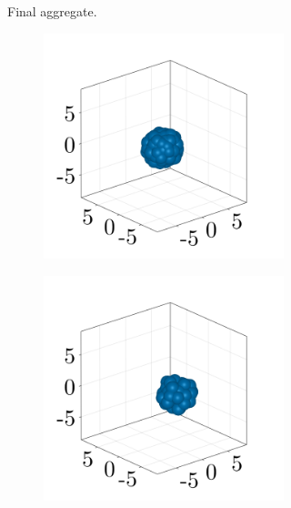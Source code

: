 \begin{figure}[ht]
\begin{subfigure}{\textwidth}
\begin{subfigure}{0.22\textwidth}
        \end{subfigure}
        \caption{Final aggregate.}
    \end{subfigure}
    \vspace{0.5em}
    \begin{subfigure}{\textwidth}
        \centering
        \begin{subfigure}{0.22\textwidth}
            \centering
            \includegraphics[width=\textwidth]{figures/303/303-aggregates-reps-nbs-1.png}
        \end{subfigure}
        \hfill
        \begin{subfigure}{0.22\textwidth}
            \centering
            \includegraphics[width=\textwidth]{figures/303/303-aggregates-reps-nbs-2.png}

\end{subfigure}
\end{subfigure}
\end{figure}
